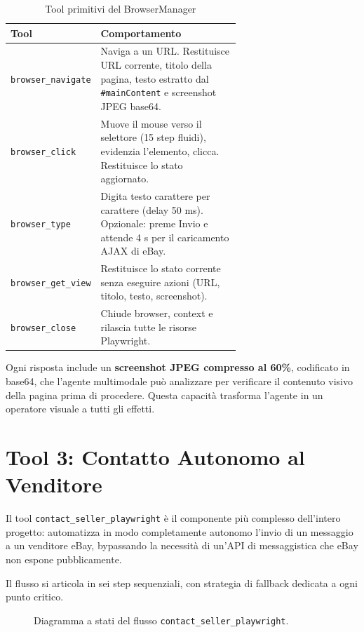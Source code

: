 \begin{table}[htbp]
\centering
\caption{Tool primitivi del BrowserManager}
\label{tab:pw-browser-tools}
\begin{tabular}{lp{0.65\linewidth}}
\hline
\textbf{Tool} & \textbf{Comportamento} \\
\hline
\texttt{browser\_navigate} & Naviga a un URL. Restituisce URL corrente, titolo della pagina, testo estratto dal \texttt{\#mainContent} e screenshot JPEG base64. \\
\texttt{browser\_click}    & Muove il mouse verso il selettore (15 step fluidi), evidenzia l'elemento, clicca. Restituisce lo stato aggiornato. \\
\texttt{browser\_type}     & Digita testo carattere per carattere (delay 50 ms). Opzionale: preme Invio e attende 4 s per il caricamento AJAX di eBay. \\
\texttt{browser\_get\_view} & Restituisce lo stato corrente senza eseguire azioni (URL, titolo, testo, screenshot). \\
\texttt{browser\_close}    & Chiude browser, context e rilascia tutte le risorse Playwright. \\
\hline
\end{tabular}
\end{table}

Ogni risposta include un \textbf{screenshot JPEG compresso al 60\%},
codificato in base64, che l'agente multimodale può analizzare per
verificare il contenuto visivo della pagina prima di procedere. Questa
capacità trasforma l'agente in un operatore visuale a tutti gli effetti.


\section{Tool 3: Contatto Autonomo al Venditore}
\label{sec:pw-contact}

Il tool \texttt{contact\_seller\_playwright} è il componente più
complesso dell'intero progetto: automatizza in modo completamente
autonomo l'invio di un messaggio a un venditore eBay, bypassando
la necessità di un'API di messaggistica che eBay non espone
pubblicamente.

Il flusso si articola in sei step sequenziali, con strategia di
fallback dedicata a ogni punto critico.

\begin{figure}[htbp]
    \centering
    \caption{Diagramma a stati del flusso \texttt{contact\_seller\_playwright}.}
    \label{fig:pw-contact-flow}
\end{figure}

